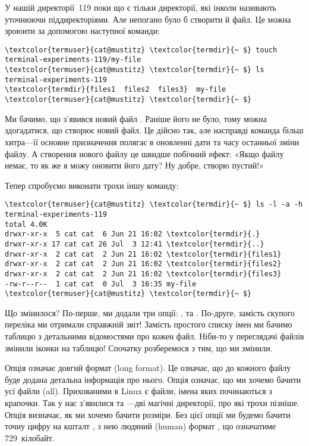 У нашій директорії~119 поки що є тільки директорії,
які інколи називають уточнюючи піддиректоріями.
Але непогано було б створити й файл.
Це можна зроюити за допомогою наступної команди:

\begin{Verbatim}[fontsize=\footnotesize,commandchars=\\\{\},xleftmargin=\parindent]
\textcolor{termuser}{cat@mustitz} \textcolor{termdir}{~ $} touch terminal-experiments-119/my-file
\textcolor{termuser}{cat@mustitz} \textcolor{termdir}{~ $} ls terminal-experiments-119
\textcolor{termdir}{files1  files2  files3}  my-file
\textcolor{termuser}{cat@mustitz} \textcolor{termdir}{~ $}
\end{Verbatim}

Ми бачимо, що з'явився новий файл .
Раніше його не було, тому можна здогадатися, що  створює новий файл.
Це дійсно так, але насправді команда  більш хитра---її основне призначення
полягає в оновленні дати та часу останньої зміни файлу.
А створення нового файлу це швидше побічний ефект:
«Якщо файлу немає, то як же я можу оновити його дату? Ну добре, створю пустий!»

Тепер спробуємо виконати трохи іншу команду:

\begin{Verbatim}[fontsize=\footnotesize,commandchars=\\\{\},xleftmargin=\parindent]
\textcolor{termuser}{cat@mustitz} \textcolor{termdir}{~ $} ls -l -a -h terminal-experiments-119
total 4.0K
drwxr-xr-x  5 cat cat  6 Jun 21 16:02 \textcolor{termdir}{.}
drwxr-xr-x 17 cat cat 26 Jul  3 12:41 \textcolor{termdir}{..}
drwxr-xr-x  2 cat cat  2 Jun 21 16:02 \textcolor{termdir}{files1}
drwxr-xr-x  2 cat cat  2 Jun 21 16:02 \textcolor{termdir}{files2}
drwxr-xr-x  2 cat cat  2 Jun 21 16:02 \textcolor{termdir}{files3}
-rw-r--r--  1 cat cat  0 Jul  3 16:35 my-file
\textcolor{termuser}{cat@mustitz} \textcolor{termdir}{~ $}
\end{Verbatim}

Що змінилося?
По-перше, ми додали три опції: ,  та .
По-друге, замість скупого переліка ми отримали справжній звіт!
Замість простого списку імен ми бачимо таблицю з детальними відомостями про кожен файл.
Ніби-то у переглядачі файлів змінили іконки на таблицю!
Спочатку розберемося з тим, що ми змінили.

Опція  означає довгий формат (long format).
Це означає, що до кожного файлу буде додана детальна інформація про нього.
Опція  означає, що ми хочемо бачити усі файли (all).
Прихованими в Linux є файли, імена яких починаються з крапочки.
Так у нас з'явилися  та ---дві магічні директорії, про які трохи пізніше.
Опція  визначає, як ми хочемо бачити розміри.
Без цієї опції ми будемо бачити точну цифру на кшталт ,
з нею людяний (human) формат , що означатиме 729~кілобайт.

